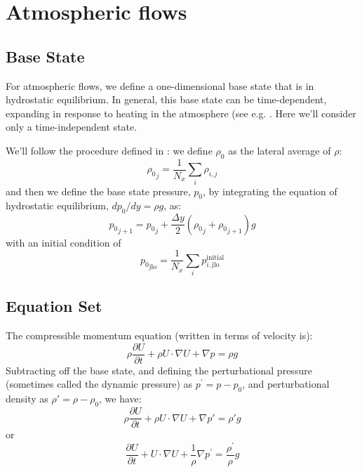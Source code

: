\section{Atmospheric flows}

\subsection{Base State}

For atmospheric flows, we define a one-dimensional base state that is
in hydrostatic equilibrium.  In general, this base state can be
time-dependent, expanding in response to heating in the atmosphere
(see e.g. \cite{almgren:2000,ABRZ:II}.  Here we'll consider only a
time-independent state.

We'll follow the procedure defined in \cite{multilevel}: we define
$\rho_0$ as the lateral average of $\rho$:
\begin{equation}
{\rho_0}_j = \frac{1}{N_x} \sum_i \rho_{i,j}
\end{equation}
and then we define the base state pressure, $p_0$, by integrating the
equation of hydrostatic equilibrium, $dp_0/dy = \rho g$, as:
\begin{equation}
{p_0}_{j+1} = {p_0}_j + \frac{\Delta y}{2} ({\rho_0}_j + {\rho_0}_{j+1}) g
\end{equation}
with an initial condition of 
\begin{equation}
{p_0}_\mathrm{jlo} = \frac{1}{N_x} \sum_{i} p^\mathrm{initial}_{i,\mathrm{jlo}}
\end{equation}



\subsection{Equation Set}

The compressible momentum equation (written in terms of velocity is):
\begin{equation}
\rho \frac{\partial U}{\partial t} + \rho U \cdot \nabla U + \nabla p = \rho g
\end{equation}
Subtracting off the base state, and defining the perturbational
pressure (sometimes called the dynamic pressure) as $p^\prime = p -
p_0$, and perturbational density as $\rho' = \rho - \rho_0$, we have:
\begin{equation}
\rho \frac{\partial U}{\partial t} + \rho U \cdot \nabla U + \nabla p' = \rho' g
\end{equation}
or 
\begin{equation}
\frac{\partial U}{\partial t} + U \cdot \nabla U + \frac{1}{\rho} \nabla p^\prime = 
   \frac{\rho^\prime}{\rho} g
\end{equation}


